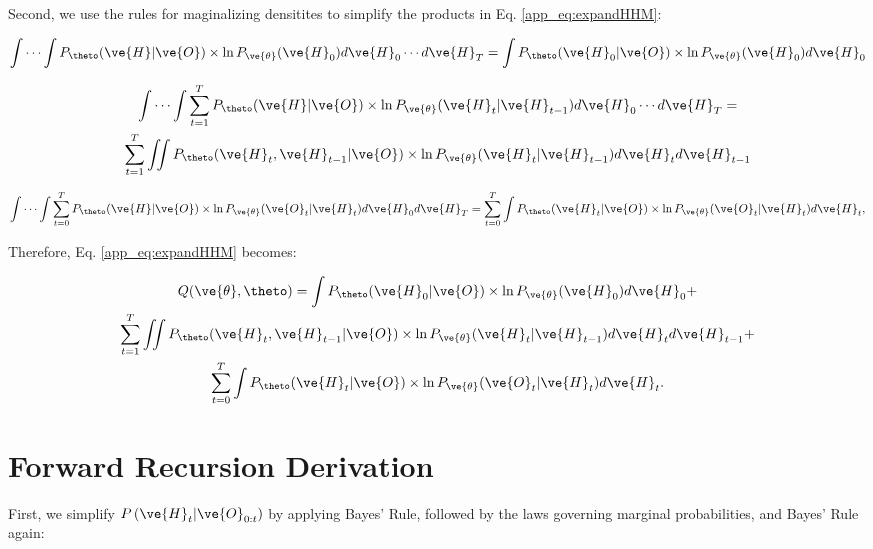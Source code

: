 \documentclass{article}
\begin{document}
\noindent Second, we use the rules for maginalizing densitites to simplify
the products in Eq. \ref{app_eq:expandHHM}:

\begin{align}
\idotsint P_{\theto} (\ve{H} |  \ve{O})
\times \ln P_{\ve{\theta}}(\ve{H}_0) d\ve{H}_0 \cdots d\ve{H}_T = \int P_{\theto} (\ve{H}_0 | \ve{O}) \times \ln P_{\ve{\theta}}(\ve{H}_0) d\ve{H}_0
\end{align}

\begin{multline}
\idotsint \sum_{t=1}^T P_{\theto} (\ve{H} |  \ve{O}) \times \ln P_{\ve{\theta}} (\ve{H}_t | \ve{H}_{t-1}) d\ve{H}_0 \cdots d\ve{H}_T = \\
\sum_{t=1}^T \iint P_{\theto} (\ve{H}_t,\ve{H}_{t-1} | \ve{O})  \times \ln P_{\ve{\theta}}(\ve{H}_t |  \ve{H}_{t-1}) d\ve{H}_t d\ve{H}_{t-1}
\end{multline}

\begin{align}
\idotsint \sum_{t=0}^T P_{\theto} (\ve{H} |  \ve{O}) \times \ln P_{\ve{\theta}} (\ve{O}_t | \ve{H}_t) d\ve{H}_0 d\ve{H}_T = %
\sum_{t=0}^T \int P_{\theto} (\ve{H}_t |  \ve{O}) \times \ln P_{\ve{\theta}} (\ve{O}_t |  \ve{H}_t) d\ve{H}_t,
\end{align}

\noindent Therefore, Eq. \ref{app_eq:expandHHM} becomes:

\begin{multline}
Q(\ve{\theta},\theto) = \int P_{\theto} (\ve{H}_0 | \ve{O}) \times \ln P_{\ve{\theta}}(\ve{H}_0)  d\ve{H}_0 + \\
\sum_{t=1}^T \iint P_{\theto} (\ve{H}_t,\ve{H}_{t-1} | \ve{O})  \times \ln P_{\ve{\theta}} (\ve{H}_t |  \ve{H}_{t-1}) d\ve{H}_t d\ve{H}_{t-1} + \\
\sum_{t=0}^T \int P_{\theto} (\ve{H}_t |  \ve{O}) \times \ln P_{\ve{\theta}} (\ve{O}_t |  \ve{H}_t) d\ve{H}_t.
\end{multline}

\section{Forward Recursion Derivation} \label{sec:for}

First, we simplify $P\left(\ve{H}_t | \ve{O}_{0:t}\right)$ by applying Bayes' Rule, followed by the laws governing marginal probabilities, and Bayes' Rule again:
\end{document}
